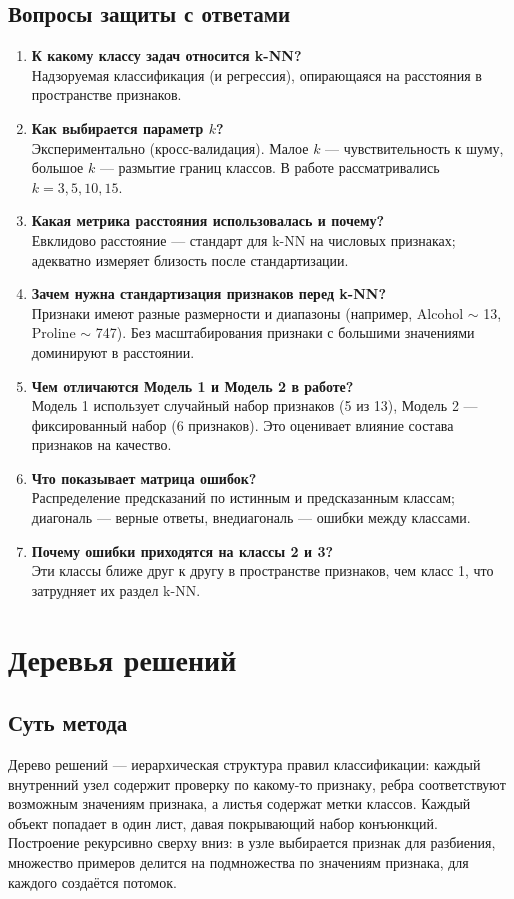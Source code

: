 \documentclass[12pt,a4paper]{article}
\begin{document}
\subsection{Вопросы защиты с ответами}
\begin{enumerate}
\item \textbf{К какому классу задач относится k-NN?}\\
Надзоруемая классификация (и регрессия), опирающаяся на расстояния в пространстве признаков.
\item \textbf{Как выбирается параметр $k$?}\\
Экспериментально (кросс-валидация). Малое $k$ --- чувствительность к шуму, большое $k$ --- размытие границ классов. В работе рассматривались $k = 3, 5, 10, 15$.
\item \textbf{Какая метрика расстояния использовалась и почему?}\\
Евклидово расстояние --- стандарт для k-NN на числовых признаках; адекватно измеряет близость после стандартизации.
\item \textbf{Зачем нужна стандартизация признаков перед k-NN?}\\
Признаки имеют разные размерности и диапазоны (например, Alcohol $\sim$ 13, Proline $\sim$ 747). Без масштабирования признаки с большими значениями доминируют в расстоянии.
\item \textbf{Чем отличаются Модель 1 и Модель 2 в работе?}\\
Модель 1 использует случайный набор признаков (5 из 13), Модель 2 --- фиксированный набор (6 признаков). Это оценивает влияние состава признаков на качество.
\item \textbf{Что показывает матрица ошибок?}\\
Распределение предсказаний по истинным и предсказанным классам; диагональ --- верные ответы, внедиагональ --- ошибки между классами.
\item \textbf{Почему ошибки приходятся на классы 2 и 3?}\\
Эти классы ближе друг к другу в пространстве признаков, чем класс 1, что затрудняет их раздел k-NN.
\end{enumerate}

\section{Деревья решений}

\subsection{Суть метода}
Дерево решений --- иерархическая структура правил классификации: каждый внутренний узел содержит проверку по какому-то признаку, ребра соответствуют возможным значениям признака, а листья содержат метки классов. Каждый объект попадает в один лист, давая покрывающий набор конъюнкций. Построение рекурсивно сверху вниз: в узле выбирается признак для разбиения, множество примеров делится на подмножества по значениям признака, для каждого создаётся потомок.
\end{document}

